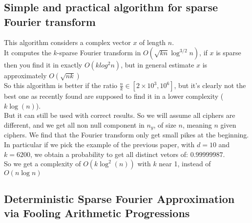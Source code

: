 \documentclass{article}
\begin{document}
\subsection{Simple and practical algorithm for sparse Fourier transform}
This algorithm considers a complex vector $x$ of length $n$.\\
It computes the $k$-sparse Fourier transform in $O(\sqrt{kn}\log^{3/2}n)$, if $x$ is sparse then you find it in exactly $O(klog^{2}n)$, but in general estimate $x$ is approximately $O(\sqrt{nk})$\\
So this algorithm is better if the ratio $\frac{n}{k} \in [2 \times 10^3, 10^6]$, but it's clearly not the best one as recently found are supposed to find it in a lower complexity ($k\log(n)$).\\
But it can still be used with correct results.
So we will assume all ciphers are different, and we get all non null component in $n_y$, of size $n$, meaning $n$ given ciphers. We find that the Fourier transform only get small pikes at the beginning.\\
In particular if we pick the example of the previous paper, with $d=10$ and $k=6200$, we obtain a probability to get all distinct vetors of: $0.99999987$.\\
So we get a complexity of  $O(k\log^2(n))$ with $k$ near 1, instead of $O(n\log n)$
\subsection{Deterministic Sparse Fourier Approximation via Fooling Arithmetic Progressions}
\end{document}
